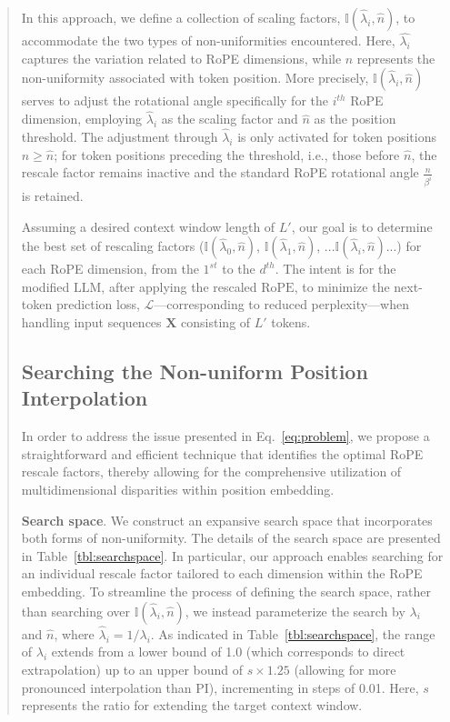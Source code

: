 \begin{abstract}
In this approach, we define a collection of scaling factors, $\mathbb{I}(\hat{\lambda}_{i},\hat{n})$, to accommodate the two types of non-uniformities encountered. Here, $\hat{\lambda_i}$ captures the variation related to RoPE dimensions, while $\hat{n}$ represents the non-uniformity associated with token position. More precisely, $\mathbb{I}(\hat{\lambda}_{i},\hat{n})$ serves to adjust the rotational angle specifically for the $i^{th}$ RoPE dimension, employing $\hat{\lambda}_{i}$ as the scaling factor and $\hat{n}$ as the position threshold. The adjustment through $\hat{\lambda}_{i}$ is only activated for token positions $n \geq \hat{n}$; for token positions preceding the threshold, i.e., those before $\hat{n}$, the rescale factor remains inactive and the standard RoPE rotational angle $\frac{n}{\beta^i}$ is retained.

Assuming a desired context window length of $L'$, our goal is to determine the best set of rescaling factors ($\mathbb{I}(\hat{\lambda}_{0},\hat{n})$, $\mathbb{I}(\hat{\lambda}_{1},\hat{n})$, ...$\mathbb{I}(\hat{\lambda}_{i},\hat{n})$...) for each RoPE dimension, from the $1^{st}$ to the $d^{th}$. The intent is for the modified $\text{LLM}$, after applying the rescaled $\text{RoPE}$, to minimize the next-token prediction loss, $\mathcal{L}$—corresponding to reduced perplexity—when handling input sequences $\mathbf{X}$ consisting of $L'$ tokens.

\subsection{Searching the Non-uniform Position Interpolation}

In order to address the issue presented in Eq.~\ref{eq:problem}, we propose a straightforward and efficient technique that identifies the optimal RoPE rescale factors, thereby allowing for the comprehensive utilization of multidimensional disparities within position embedding.

\textbf{Search space}. We construct an expansive search space that incorporates both forms of non-uniformity. The details of the search space are presented in Table~\ref{tbl:searchspace}. In particular, our approach enables searching for an individual rescale factor tailored to each dimension within the RoPE embedding. To streamline the process of defining the search space, rather than searching over $\mathbb{I}(\hat{\lambda}_{i},\hat{n})$, we instead parameterize the search by $\lambda_i$ and $\hat{n}$, where $\hat{\lambda}_{i}=1/\lambda_i$. As indicated in Table~\ref{tbl:searchspace}, the range of $\lambda_i$ extends from a lower bound of 1.0 (which corresponds to direct extrapolation) up to an upper bound of $s\times1.25$ (allowing for more pronounced interpolation than PI), incrementing in steps of 0.01. Here, $s$ represents the ratio for extending the target context window.


\end{abstract}
